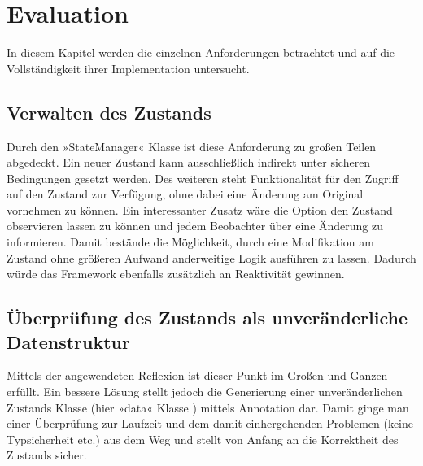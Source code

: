 \section{Evaluation}
\label{sec:evaluation}
In diesem Kapitel werden die einzelnen Anforderungen betrachtet und auf die Vollständigkeit ihrer Implementation untersucht.

\subsection{Verwalten des Zustands}
Durch den »StateManager« Klasse ist diese Anforderung zu großen Teilen abgedeckt. Ein neuer Zustand kann ausschließlich indirekt unter sicheren Bedingungen gesetzt werden. Des weiteren steht Funktionalität für den Zugriff auf den Zustand zur Verfügung, ohne dabei eine Änderung am Original vornehmen zu können. Ein interessanter Zusatz wäre die Option den Zustand observieren lassen zu können und jedem Beobachter über eine Änderung zu informieren. Damit bestände die Möglichkeit, durch eine Modifikation am Zustand ohne größeren Aufwand anderweitige Logik ausführen zu lassen. Dadurch würde das Framework ebenfalls zusätzlich an Reaktivität gewinnen.  

\subsection{Überprüfung des Zustands als unveränderliche Datenstruktur}
Mittels der angewendeten Reflexion ist dieser Punkt im Großen und Ganzen erfüllt. Ein bessere Lösung stellt jedoch die Generierung einer unveränderlichen Zustands Klasse (hier »data« Klasse ) mittels Annotation dar. Damit ginge man einer Überprüfung zur Laufzeit und dem damit einhergehenden Problemen (keine Typsicherheit etc.) aus dem Weg und stellt von Anfang an die Korrektheit des Zustands sicher. 

